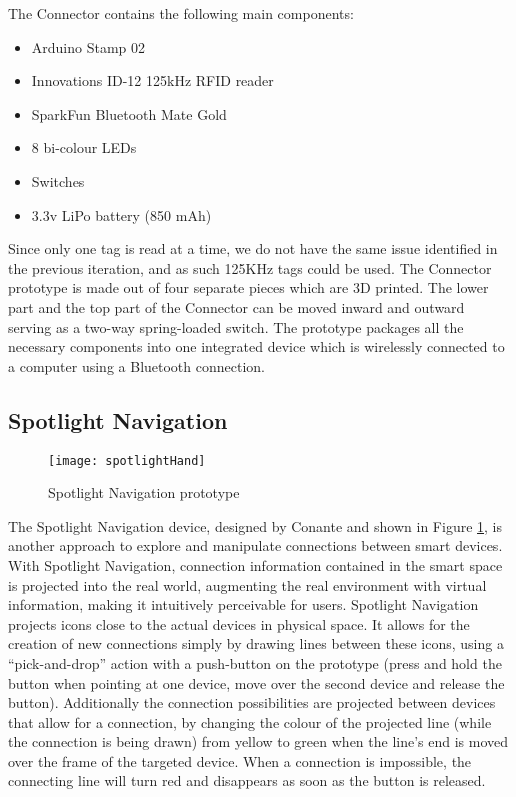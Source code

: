 The Connector contains the following main components:

\begin{itemize}
\item Arduino Stamp 02
\item Innovations ID-12 125kHz RFID reader
\item SparkFun Bluetooth Mate Gold
\item 8 bi-colour LEDs
\item Switches
\item 3.3v LiPo battery (850 mAh)
\end{itemize}

Since only one tag is read at a time, we do not have the same issue identified in the previous iteration, and as such 125KHz tags could be used. The Connector prototype is made out of four separate pieces which are 3D printed. The lower part and the top part of the Connector can be moved inward and outward serving as a two-way spring-loaded switch. The prototype packages all the necessary components into one integrated device which is wirelessly connected to a computer using a Bluetooth connection. 


\subsection{Spotlight Navigation}\label{SpotlightNavigation}

\begin{figure}
\centering
\texttt{[image: spotlightHand]}
\caption{Spotlight Navigation prototype}
\label{projector}
\end{figure}

The Spotlight Navigation device, designed by Conante and shown in Figure \ref{projector}, is another approach to explore and manipulate connections between smart devices. With Spotlight Navigation, connection information contained in the smart space is projected into the real world, augmenting the real environment with virtual information, making it intuitively perceivable for users. Spotlight Navigation projects icons close to the actual devices in physical space. It allows for the creation of new connections simply by drawing lines between these icons, using a ``pick-and-drop'' action with a push-button on the prototype (press and hold the button when pointing at one device, move over the second device and release the button). Additionally the connection possibilities are projected between devices that allow for a connection, by changing the colour of the projected line (while the connection is being drawn) from yellow to green when the line's end is moved over the frame of the targeted device. When a connection is impossible, the connecting line will turn red and disappears as soon as the button is released.

